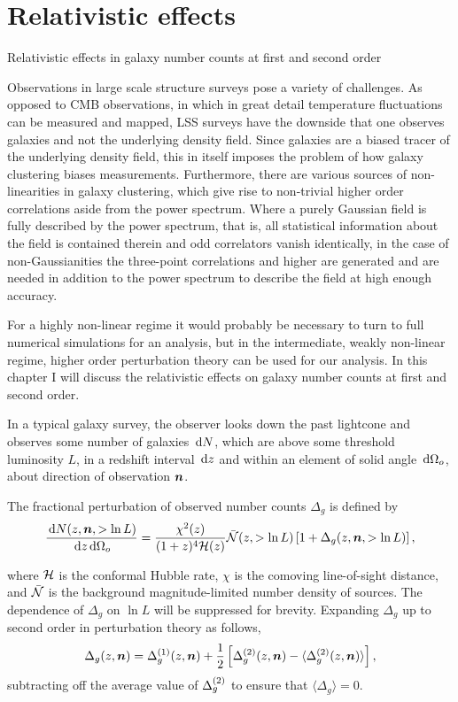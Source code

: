 \chapter{Relativistic effects}
\label{chapter:introreleff}

Relativistic effects in galaxy number counts at first and second order

Observations in large scale structure surveys pose a variety of challenges. As opposed to CMB observations, in which in great detail temperature fluctuations can be measured and mapped, LSS surveys have the downside that one observes galaxies and not the underlying density field. Since galaxies are a biased tracer of the underlying density field, this in itself imposes the problem of how galaxy clustering biases measurements. Furthermore, there are various sources of non-linearities in galaxy clustering, which give rise to non-trivial higher order correlations aside from the power spectrum. Where a purely Gaussian field is fully described by the power spectrum, that is, all statistical information about the field is contained therein and odd correlators vanish identically, in the case of non-Gaussianities the three-point correlations and higher are generated and are needed in addition to the power spectrum to describe the field at high enough accuracy. 

For a highly non-linear regime it would probably be necessary to turn to full numerical simulations for an analysis, but in the intermediate, weakly non-linear regime, higher order perturbation theory can be used for our analysis. In this chapter I will discuss the relativistic effects on galaxy number counts at first and second order.  

In a typical galaxy survey, the observer looks down the past lightcone and observes some number of galaxies $\,\mathrm{d} N$, which are above some threshold luminosity $L$, in a redshift interval $\,\mathrm{d} z$ and within an element of solid angle $\,\mathrm{d} \Omega_o$, about direction of observation $\bm {n}$. 

The fractional perturbation of observed number counts $\Delta_g$ is defined by 
\begin{equation}
	\frac{\,\mathrm{d} N(z, \bm {n}, > \ln L)}{\,\mathrm{d} z \,\mathrm{d} \Omega_o} = \frac{\chi^2(z)}{(1 + z)^4 \mathcal{H}(z)} \bar{\mathcal{N}}(z, > \ln L) \left[ 1 + \Delta_g(z, \bm {n}, >\ln L)\right], 
\end{equation}

where $\mathcal{H}$ is the conformal Hubble rate, $\chi$ is the comoving line-of-sight distance, and $\bar{\mathcal{N}}$ is the background magnitude-limited number density of sources. The dependence of $\Delta_g$ on $\ln L$ will be suppressed for brevity. Expanding $\Delta_g$ up to second order in perturbation theory as follows, 
\begin{equation}
	\Delta_g(z,\bm {n}) = \Delta_g^{(1)}(z,\bm {n}) + \frac{1}{2} \left[ \Delta_g^{(2)}(z,\bm {n}) - \langle \Delta_g^{(2)} (z,\bm {n})\rangle \right],
\end{equation}
subtracting off the average value of $\Delta_g^{(2)}$ to ensure that $\langle \Delta_g \rangle = 0$.

